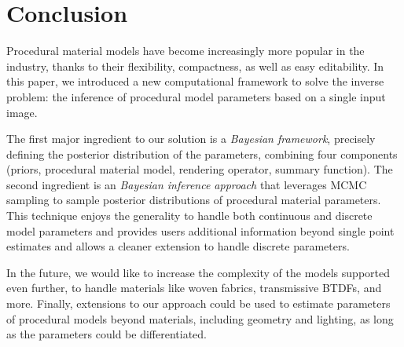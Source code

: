 \section{Conclusion}
\label{sec:bayesian:conclusion}

Procedural material models have become increasingly more popular in the industry, thanks to their flexibility, compactness, as well as easy editability.
In this paper, we introduced a new computational framework to solve the inverse problem: the inference of procedural model parameters based on a single input image.

The first major ingredient to our solution is a \emph{Bayesian framework}, precisely defining the posterior distribution of the parameters, combining four components (priors, procedural material model, rendering operator, summary function). The second ingredient is an \emph{Bayesian inference approach} that leverages MCMC sampling to sample posterior distributions of procedural material parameters.  This technique enjoys the generality to handle both continuous and discrete model parameters and provides users additional information beyond single point estimates and allows a cleaner extension to handle discrete parameters.

In the future, we would like to increase the complexity of the models supported even further, to handle materials like woven fabrics, transmissive BTDFs, and more. Finally, extensions to our approach could be used to estimate parameters of procedural models beyond materials, including geometry and lighting, as long as the parameters could be differentiated.
